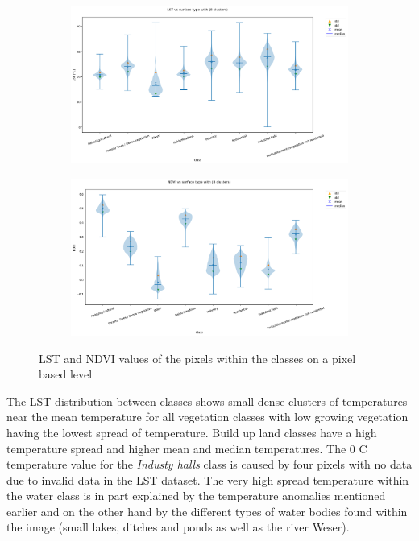 \documentclass[a4paper, english]{article}
\begin{document}
\begin{figure}[!phtb]
    \centering
    \begin{subfigure}{\textwidth}
    \includegraphics[width=\textwidth]{img/LST vs surface type with (8 clusters).png}
    \end{subfigure}
    \begin{subfigure}{\textwidth}
    \includegraphics[width=\textwidth]{img/NDVI vs surface type with (8 clusters).png}
    \end{subfigure}
    \caption{\ac{LST} and \ac{NDVI} values of the pixels within the classes on a pixel based level\label{fig:clusters}}
\end{figure}
The \ac{LST} distribution between classes shows small dense clusters of temperatures near the mean temperature for all vegetation classes with low growing vegetation having the lowest spread of temperature. 
Build up land classes have a high temperature spread and higher mean and median temperatures. 
The 0 \textdegree C temperature value for the \textit{Industy halls} class is caused by four pixels with no data due to invalid data in the \ac{LST} dataset.
The very high spread temperature within the water class is in part explained by the temperature anomalies mentioned earlier and on the other hand by the different types of water bodies found within the image (small lakes, ditches and ponds as well as the river Weser). 
\newpage
\end{document}
